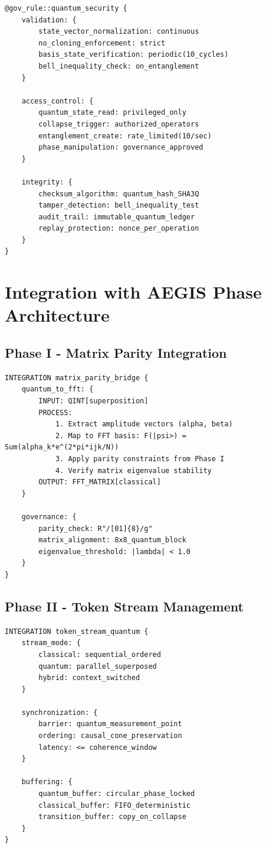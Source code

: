 \documentclass[12pt,a4paper]{article}
\begin{document}
\begin{lstlisting}[style=riftlang,caption={Quantum Security Governance}]
@gov_rule::quantum_security {
    validation: {
        state_vector_normalization: continuous
        no_cloning_enforcement: strict
        basis_state_verification: periodic(10_cycles)
        bell_inequality_check: on_entanglement
    }
    
    access_control: {
        quantum_state_read: privileged_only
        collapse_trigger: authorized_operators
        entanglement_create: rate_limited(10/sec)
        phase_manipulation: governance_approved
    }
    
    integrity: {
        checksum_algorithm: quantum_hash_SHA3Q
        tamper_detection: bell_inequality_test
        audit_trail: immutable_quantum_ledger
        replay_protection: nonce_per_operation
    }
}
\end{lstlisting}

\section{Integration with AEGIS Phase Architecture}

\subsection{Phase I - Matrix Parity Integration}

\begin{lstlisting}[style=riftlang,caption={Matrix Parity Bridge}]
INTEGRATION matrix_parity_bridge {
    quantum_to_fft: {
        INPUT: QINT[superposition]
        PROCESS: 
            1. Extract amplitude vectors (alpha, beta)
            2. Map to FFT basis: F(|psi>) = Sum(alpha_k*e^(2*pi*ijk/N))
            3. Apply parity constraints from Phase I
            4. Verify matrix eigenvalue stability
        OUTPUT: FFT_MATRIX[classical]
    }
    
    governance: {
        parity_check: R"/[01]{8}/g" 
        matrix_alignment: 8x8_quantum_block
        eigenvalue_threshold: |lambda| < 1.0
    }
}
\end{lstlisting}

\subsection{Phase II - Token Stream Management}

\begin{lstlisting}[style=riftlang,caption={Token Stream Integration}]
INTEGRATION token_stream_quantum {
    stream_mode: {
        classical: sequential_ordered
        quantum: parallel_superposed
        hybrid: context_switched
    }
    
    synchronization: {
        barrier: quantum_measurement_point
        ordering: causal_cone_preservation
        latency: <= coherence_window
    }
    
    buffering: {
        quantum_buffer: circular_phase_locked
        classical_buffer: FIFO_deterministic
        transition_buffer: copy_on_collapse
    }
}
\end{lstlisting}
\end{document}
